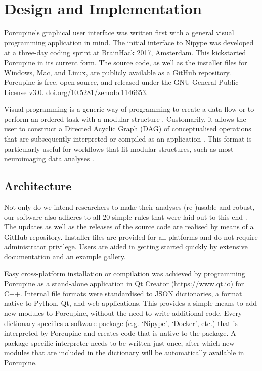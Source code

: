 \section{Design and Implementation}
Porcupine's graphical user interface was written first with a general visual programming application in mind. The initial interface to Nipype was developed at a three-day coding sprint at BrainHack 2017, Amsterdam. This kickstarted Porcupine in its current form. The source code, as well as the installer files for Windows, Mac, and Linux, are publicly available as a \href{https://github.com/TimVanMourik/Porcupine}{GitHub repository}. Porcupine is free, open source, and released under the GNU General Public License v3.0.  \url{doi.org/10.5281/zenodo.1146653}.

Visual programming is a generic way of programming to create a data flow or to perform an ordered task with a modular structure \cite{Myers1986}. Customarily, it allows the user to construct a Directed Acyclic Graph (DAG) \cite{Thulasiraman1992} of conceptualised operations that are subsequently interpreted or compiled as an application \cite{Myers1990}. This format is particularly useful for workflows that fit modular structures, such as most neuroimaging data analyses \cite{Rex2003}. 

\subsection{Architecture}
Not only do we intend researchers to make their analyses (re-)usable and robust, our software also adheres to all 20 simple rules that were laid out to this end \cite{List2017,Taschuk2017}. The updates as well as the releases of the source code are realised by means of a GitHub repository. Installer files are provided for all platforms and do not require administrator privilege. Users are aided in getting started quickly by extensive documentation and an example gallery.

Easy cross-platform installation or compilation was achieved by programming Porcupine as a stand-alone application in Qt Creator (\url{https://www.qt.io}) for C++. Internal file formats were standardised to JSON dictionaries, a format native to Python, Qt, and web applications. This provides a simple means to add new modules to Porcupine, without the need to write additional code. Every dictionary specifies a software package (e.g. `Nipype', `Docker', etc.) that is interpreted by Porcupine and creates code that is native to the package. A package-specific interpreter needs to be written just once, after which new modules that are included in the dictionary will be automatically available in Porcupine.

